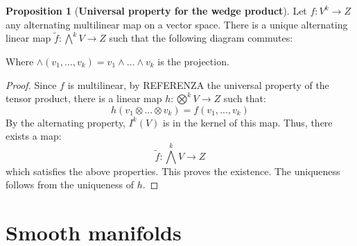 \documentclass[12pt,a4paper]{report}
\theoremstyle{definition}
\theoremstyle{Theorem}
\newtheorem{Prop}[Def]{Proposition}
\theoremstyle{break}
\theoremstyle{definition}
\begin{document}
	\begin{Prop}[\textbf{Universal property for the wedge product}]
		Let $f:V^k\rightarrow Z$ any alternating multilinear map on a vector space. There is a unique alternating linear map $\tilde{f}:\bigwedge^kV\rightarrow Z$ such that the following diagram commutes:
		\begin{center}
		\end{center}
		Where $\wedge(v_1,...,v_k)=v_1\wedge ...\wedge v_k$ is the projection.
	\end{Prop}
	\begin{proof}
		Since $f$ is multilinear, by REFERENZA the universal property of the tensor product, there is a linear map $h:\bigotimes^k V\rightarrow Z$ such that:
		$$h(v_1\otimes...\otimes v_k)=f(v_1,...,v_k)$$
		By the alternating property, $I^k(V)$ is in the kernel of this map. Thus, there exists a map:
		$$\tilde{f}:\bigwedge^k V\rightarrow Z$$
		which satisfies the above properties. This proves the existence. The uniqueness follows from the uniqueness of $h$.
	\end{proof}
	\chapter{Smooth manifolds}
\end{document}
